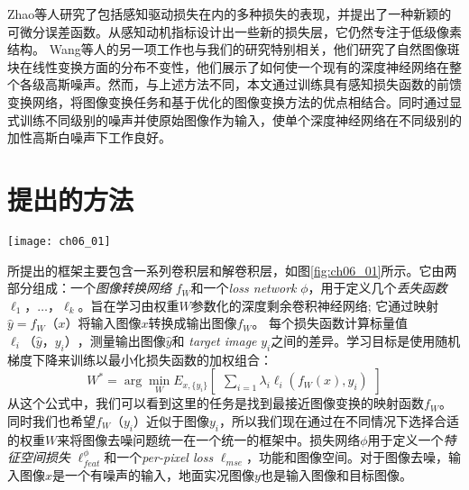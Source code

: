 Zhao等人\cite{Zhao2015}研究了包括感知驱动损失在内的多种损失的表现，并提出了一种新颖的可微分误差函数。从感知动机指标设计出一些新的损失层，它仍然专注于低级像素结构。
Wang等人的另一项工作\cite{Wang2014a}也与我们的研究特别相关，他们研究了自然图像斑块在线性变换方面的分布不变性，他们展示了如何使一个现有的深度神经网络在整个各级高斯噪声。然而，与上述方法不同，本文通过训练具有感知损失函数的前馈变换网络，将图像变换任务和基于优化的图像变换方法的优点相结合。同时通过显式训练不同级别的噪声并使原始图像作为输入，使单个深度神经网络在不同级别的加性高斯白噪声下工作良好。

\section{提出的方法} 

\label{sec:method}
\begin{figure*}
\vspace{-6mm}
\centering
\texttt{[image: ch06\_01]}
\caption{我们提出的网络的整体架构。图像变换网络包含卷积（编码器）和解卷积（解码器）层。我们使用预先训练的图像分类的损失网络来定义感知损失函数，这些函数测量输出和地面真实标签的感知差异。损失网络在训练过程中保持不变。}
\label{fig:ch06_01}
\vspace{-10mm}
\end{figure*}
 
所提出的框架主要包含一系列卷积层和解卷积层，如图\ref{fig:ch06_01}所示。它由两部分组成：一个\emph {图像转换网络} $ f_W $和一个\emph{loss network} $ \phi $，用于定义几个\emph {丢失函数} $ \ell_1，\ldots，\ell_k$。旨在学习由权重$ W $参数化的深度剩余卷积神经网络; 它通过映射$ \hat y = f_W（x）$将输入图像$ x $转换成输出图像$ f_W $。
每个损失函数计算标量值$ \ell_i（\hat y，y_i）$，测量输出图像$ \hat y $和 \emph{target image} $ y_i $之间的差异。学习目标是使用随机梯度下降来训练以最小化损失函数的加权组合：
\begin{equation}
   W^* = \arg\min_W E_{x, \{y_i\}}\begin{bmatrix}
\sum_{i=1} \lambda_i \ell_i(f_W(x), y_i)
\end{bmatrix}
\end{equation}
从这个公式中，我们可以看到这里的任务是找到最接近图像变换的映射函数$ f_W $。同时我们也希望$ f_W（y_i）$近似于图像$ y_i $，所以我们现在通过在不同情况下选择合适的权重$ W $来将图像去噪问题统一在一个统一的框架中。损失网络$ \phi $用于定义一个\emph{特征空间损失} $ \ell_{feat}^\phi $和一个\emph{per-pixel loss} $ \ell_{mse} $，功能和图像空间。对于图像去噪，输入图像$ x $是一个有噪声的输入，地面实况图像$ y $也是输入图像和目标图像。
  
